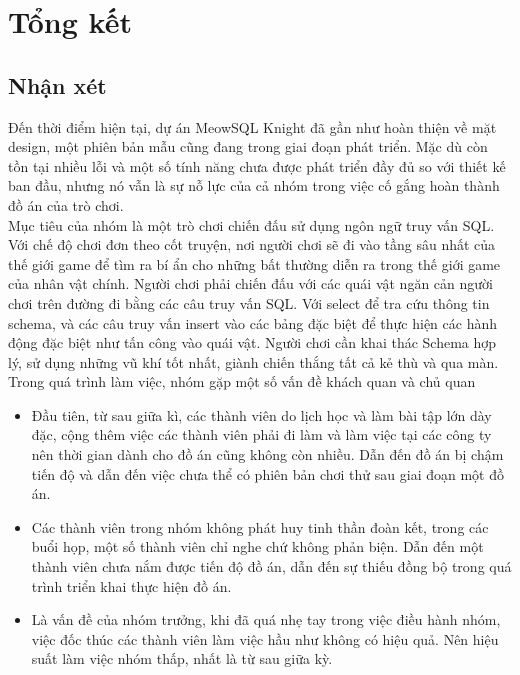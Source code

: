 \section{Tổng kết}
\subsection{Nhận xét}
\hspace*{0.5cm} Đến thời điểm hiện tại, dự án MeowSQL Knight đã gần như hoàn thiện về mặt design, một phiên bản mẫu cũng đang trong giai đoạn phát triển. Mặc dù còn tồn tại nhiều lỗi và một số tính năng chưa được phát triển đầy đủ so với thiết kế ban đầu, nhưng nó vẫn là sự nỗ lực của cả nhóm trong việc cố gắng hoàn thành đồ án của trò chơi.\\
\hspace*{0.5cm} Mục tiêu của nhóm là một trò chơi chiến đấu sử dụng ngôn ngữ truy vấn SQL. Với chế độ chơi đơn theo cốt truyện, nơi người chơi sẽ đi vào tầng sâu nhất của thế giới game để tìm ra bí ẩn cho những bất thường diễn ra trong thế giới game của nhân vật chính. Người chơi phải chiến đấu với các quái vật ngăn cản người chơi trên đường đi bằng các câu truy vấn SQL. Với select để tra cứu thông tin schema, và các câu truy vấn insert vào các bảng đặc biệt để thực hiện các hành động đặc biệt như tấn công vào quái vật. Người chơi cần khai thác Schema hợp lý, sử dụng những vũ khí tốt nhất, giành chiến thắng tất cả kẻ thù và qua màn.\\
\hspace*{0.5cm} Trong quá trình làm việc, nhóm gặp một số vấn đề khách quan và chủ quan
\begin{itemize}
	\item Đầu tiên, từ sau giữa kì, các thành viên do lịch học và làm bài tập lớn dày đặc, cộng thêm việc các thành viên phải đi làm và làm việc tại các công ty nên thời gian dành cho đồ án cũng không còn nhiều. Dẫn đến đồ án bị chậm tiến độ và dẫn đến việc chưa thể có phiên bản chơi thử sau giai đoạn một đồ án.
	\item Các thành viên trong nhóm không phát huy tinh thần đoàn kết, trong các buổi họp, một số thành viên chỉ nghe chứ không phản biện. Dẫn đến một thành viên chưa nắm được tiến độ đồ án, dẫn đến sự thiếu đồng bộ trong quá trình triển khai thực hiện đồ án.
	\item Là vấn đề của nhóm trưởng, khi đã quá nhẹ tay trong việc điều hành nhóm, việc đốc thúc các thành viên làm việc hầu như không có hiệu quả. Nên hiệu suất làm việc nhóm thấp, nhất là từ sau giữa kỳ.
\end{itemize}
